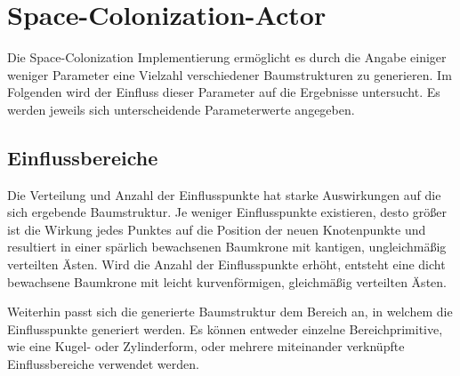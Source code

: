 \section{Space-Colonization-Actor}

Die Space-Colonization Implementierung ermöglicht es durch die Angabe einiger weniger Parameter eine Vielzahl verschiedener Baumstrukturen zu generieren. \cite[S.3]{SpaceColonizationAlgorithm:07} Im Folgenden wird der Einfluss dieser Parameter auf die Ergebnisse untersucht. Es werden jeweils sich unterscheidende Parameterwerte angegeben.

\subsection{Einflussbereiche}

Die Verteilung und Anzahl der Einflusspunkte hat starke Auswirkungen auf die sich ergebende Baumstruktur. Je weniger Einflusspunkte existieren, desto größer ist die Wirkung jedes Punktes auf die Position der neuen Knotenpunkte und resultiert in einer spärlich bewachsenen Baumkrone mit kantigen, ungleichmäßig verteilten Ästen. Wird die Anzahl der Einflusspunkte erhöht, entsteht eine dicht bewachsene Baumkrone mit leicht kurvenförmigen, gleichmäßig verteilten Ästen. \cite[S.3]{SpaceColonizationAlgorithm:07}

Weiterhin passt sich die generierte Baumstruktur dem Bereich an, in welchem die Einflusspunkte generiert werden. Es können entweder einzelne Bereichprimitive, wie eine Kugel- oder Zylinderform, oder mehrere miteinander verknüpfte Einflussbereiche verwendet werden. \cite[S.4]{SpaceColonizationAlgorithm:07}

